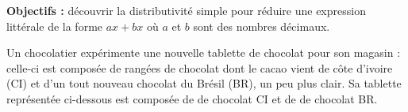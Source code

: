 \begin{changemargin}{-10mm}{-15mm}
    \begin{activite}
        {\bf Objectifs :} découvrir la distributivité simple pour réduire une expression littérale de la forme $ax+bx$ où $a$ et $b$ sont des nombres décimaux.

        \smallskip
        \begin{minipage}{0.7\linewidth}
        Un chocolatier expérimente une nouvelle tablette de chocolat pour son magasin : celle-ci est composée de rangées de chocolat dont le cacao vient de côte d'ivoire (CI) et d'un tout nouveau chocolat du Brésil (BR), un peu plus clair. Sa tablette représentée ci-dessous est composée de  de chocolat CI et de  de chocolat BR.
        \end{minipage}
        \begin{minipage}{0.3\linewidth}
           \begin{center}
           \end{center}
        \end{minipage}


\end{activite}
\end{changemargin}
